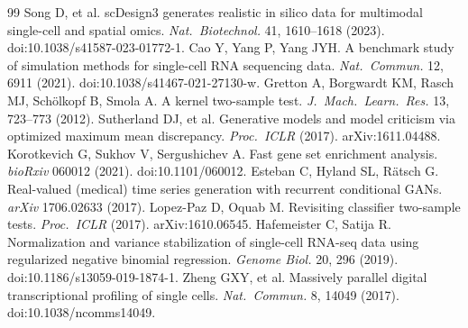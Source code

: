 \documentclass[11pt]{article}
\begin{document}
\begin{thebibliography}{99}
 Song D, et al. scDesign3 generates realistic in silico data for multimodal single-cell and spatial omics. \textit{Nat.\ Biotechnol.} 41, 1610--1618 (2023). doi:10.1038/s41587-023-01772-1.
 Cao Y, Yang P, Yang JYH. A benchmark study of simulation methods for single-cell RNA sequencing data. \textit{Nat.\ Commun.} 12, 6911 (2021). doi:10.1038/s41467-021-27130-w.
 Gretton A, Borgwardt KM, Rasch MJ, Sch\"olkopf B, Smola A. A kernel two-sample test. \textit{J.\ Mach.\ Learn.\ Res.} 13, 723--773 (2012).
 Sutherland DJ, et al. Generative models and model criticism via optimized maximum mean discrepancy. \textit{Proc.\ ICLR} (2017). arXiv:1611.04488.
 Korotkevich G, Sukhov V, Sergushichev A. Fast gene set enrichment analysis. \textit{bioRxiv} 060012 (2021). doi:10.1101/060012.
 Esteban C, Hyland SL, R\"atsch G. Real-valued (medical) time series generation with recurrent conditional GANs. \textit{arXiv} 1706.02633 (2017).
 Lopez-Paz D, Oquab M. Revisiting classifier two-sample tests. \textit{Proc.\ ICLR} (2017). arXiv:1610.06545.
 Hafemeister C, Satija R. Normalization and variance stabilization of single-cell RNA-seq data using regularized negative binomial regression. \textit{Genome Biol.} 20, 296 (2019). doi:10.1186/s13059-019-1874-1.
 Zheng GXY, et al. Massively parallel digital transcriptional profiling of single cells. \textit{Nat.\ Commun.} 8, 14049 (2017). doi:10.1038/ncomms14049.
\end{thebibliography}
\end{document}
